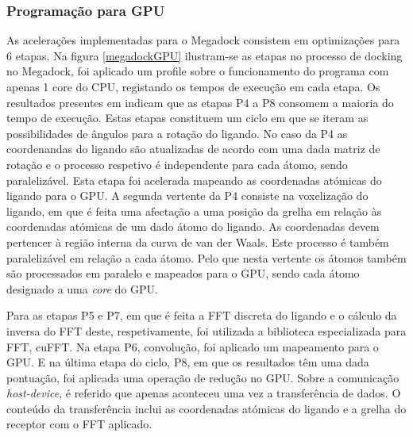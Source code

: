  \subsubsection{Programação para GPU}
As acelerações implementadas para o Megadock consistem em optimizações para 6 etapas. Na figura \ref{megadockGPU} ilustram-se as etapas no processo de docking no Megadock, foi aplicado um profile sobre o funcionamento do programa com apenas 1 core do CPU, registando os tempos de execução em cada etapa. Os resultados presentes em \cite{shimoda2015protein} indicam que as etapas P4 a P8 consomem a maioria do tempo de execução. Estas etapas constituem um ciclo em que se iteram as possibilidades de ângulos para a rotação do ligando. No caso da P4 as coordenandas do ligando são atualizadas de acordo com uma dada matriz de rotação e o processo respetivo é independente para cada átomo, sendo paralelizável. Esta etapa foi acelerada mapeando as coordenadas atómicas do ligando para o GPU. 
A segunda vertente da P4 consiste na voxelização do ligando, em que é feita uma afectação a uma posição da grelha em relação às coordenadas atómicas de um dado átomo do ligando. As coordenadas devem pertencer à região interna da curva de van der Waals. Este processo é também paralelizável em relação a cada átomo. Pelo que nesta vertente os átomos também são processados em paralelo e mapeados para o GPU, sendo cada átomo designado a uma \textit{core} do GPU.\par Para as etapas P5 e P7, em que é feita a FFT discreta do ligando e o cálculo da inversa do FFT deste, respetivamente, foi utilizada a biblioteca especializada para FFT, cuFFT. Na etapa P6, convolução, foi aplicado um mapeamento para o GPU. E na última etapa do ciclo, P8, em que os resultados têm uma dada pontuação, foi aplicada uma operação de redução no GPU. 
Sobre a comunicação \textit{host-device}, é referido que apenas aconteceu uma vez a transferência de dados. O conteúdo da transferência inclui as coordenadas atómicas do ligando e a grelha do receptor com o FFT aplicado. \par
